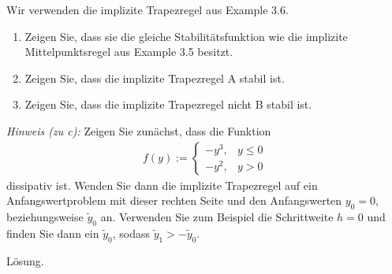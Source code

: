 \begin{exercise}
Wir verwenden die implizite Trapezregel aus Example 3.6.
\begin{enumerate}[label = \textbf{\alph*)}]
  \item Zeigen Sie, dass sie die gleiche Stabilitätsfunktion wie die implizite
  Mittelpunktsregel aus Example 3.5 besitzt.
  \item Zeigen Sie, dass die implizite Trapezregel A stabil ist.
  \item Zeigen Sie, dass die implizite Trapezregel nicht B stabil ist.
\end{enumerate}
\textit{Hinweis (zu c):} Zeigen Sie zunächst, dass die Funktion
\begin{align*}
  f(y) := \begin{cases}
    -y^3, & y \leq 0 \\
    -y^2, & y > 0
  \end{cases}
\end{align*}
dissipativ ist. Wenden Sie dann die implizite Trapezregel auf ein Anfangswertproblem
mit dieser rechten Seite und den Anfangswerten $y_0 = 0$, beziehungsweise $\widetilde{y}_0$ an.
Verwenden Sie zum Beispiel die Schrittweite $h = 0$ und finden Sie dann ein $\widetilde{y}_0$,
sodass $\widetilde{y}_1 > -\widetilde{y}_0$.
\end{exercise}
\begin{solution}
Lösung.
\end{solution}
